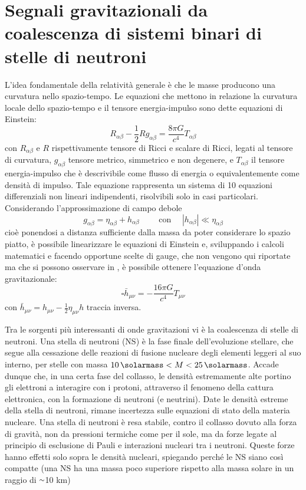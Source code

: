 \chapter{Segnali gravitazionali da coalescenza di  sistemi binari di stelle di neutroni}
\label{chapter:segnaleGWdaBNS}
L'idea fondamentale della relatività generale è che le masse producono una curvatura nello spazio-tempo. Le equazioni che mettono in relazione la curvatura locale dello spazio-tempo e il tensore energia-impulso sono dette equazioni di Einstein:
\begin{equation}
	R_{\alpha\beta} -\frac{1}{2}Rg_{\alpha\beta}=\frac{8\pi G}{c^4}T_{\alpha\beta}
\end{equation}
con $R_{\alpha\beta}$ e $R$ rispettivamente tensore di Ricci e scalare di Ricci, legati al tensore di curvatura, $g_{\alpha\beta}$ tensore metrico, simmetrico e non degenere, e $T_{\alpha\beta}$ il tensore energia-impulso che è descrivibile come flusso di energia o equivalentemente come densità di impulso.
Tale equazione rappresenta un sistema di 10 equazioni differenziali non lineari indipendenti, risolvibili solo in casi particolari. \\
Considerando l'approssimazione di campo debole 
\begin{equation}
	g_{\alpha\beta} = \eta_{\alpha\beta} + h_{\alpha\beta}\quad\quad\text{ con }\quad |h_{\alpha\beta}|\ll \eta_{\alpha\beta} 
\end{equation}
cioè ponendosi a distanza sufficiente dalla massa da poter considerare lo spazio piatto, è possibile linearizzare le equazioni di Einstein e, sviluppando i calcoli matematici e facendo opportune scelte di gauge, che non vengono qui riportate ma che si possono osservare in \cite{maggiore2008gravitational}, è possibile ottenere l'equazione d'onda gravitazionale:
\begin{equation}
	\square\bar{h}_{\mu\nu} = -\frac{16\pi G}{c^4}T_{\mu\nu}
\end{equation}
con $\bar{h}_{\mu\nu} = h_{\mu\nu} - \frac{1}{2}\eta_{\mu\nu}h$ traccia inversa.

Tra le sorgenti più interessanti di onde gravitazioni vi è la coalescenza di stelle di neutroni.
Una stella di neutroni (NS) è la fase finale dell'evoluzione stellare, che segue alla cessazione delle reazioni di fusione nucleare degli elementi leggeri al suo interno, per stelle con massa $\SI{10}{\solarmass} < M < \SI{25}{\solarmass}$. Accade dunque che, in una certa fase del collasso, le densità estremamente alte portino gli elettroni a interagire con i protoni, attraverso il fenomeno della cattura elettronica, con la formazione di neutroni (e neutrini). Date le densità estreme della stella di neutroni, rimane incertezza sulle equazioni di stato della materia nucleare\cite{hobson2006general}.
Una stella di neutroni è resa stabile, contro il collasso dovuto alla forza di gravità, non da pressioni termiche come per il sole, ma da forze legate al principio di esclusione di Pauli e interazioni nucleari tra i neutroni. Queste forze hanno effetti solo sopra le densità nucleari, spiegando perché le NS siano così compatte (una NS ha una massa poco superiore rispetto alla massa solare in un raggio di $\smallsim$10 km)\cite{hartle2003gravity}

